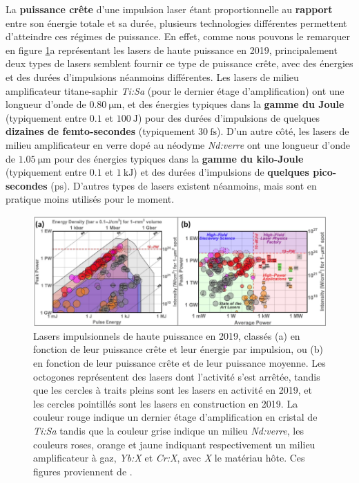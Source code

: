 \begin{refsection}
La \textbf{puissance crête} d'une impulsion laser étant proportionnelle au \textbf{rapport} entre son énergie totale et sa durée, plusieurs technologies différentes permettent d'atteindre ces régimes de puissance. En effet, comme nous pouvons le remarquer en figure \ref{fig:2-techno_laser}a représentant les lasers de haute puissance en 2019, principalement deux types de lasers semblent fournir ce type de puissance crête, avec des énergies et des durées d'impulsions néanmoins différentes. Les lasers de milieu amplificateur titane-saphir \textit{Ti:Sa} (pour le dernier étage d'amplification) ont une longueur d'onde de $0.80 ~ \si{\um}$, et des énergies typiques dans la \textbf{gamme du Joule} (typiquement entre $0.1$ et $100 ~ \si{\J}$) pour des durées d'impulsions de quelques \textbf{dizaines de femto-secondes} (typiquement $30 ~ \si{\fs}$). D'un autre côté, les lasers de milieu amplificateur en verre dopé au néodyme \textit{Nd:verre} ont une longueur d'onde de $1.05 ~ \si{\um}$ pour des énergies typiques dans la \textbf{gamme du kilo-Joule} (typiquement entre $0.1$ et $1~ \si{\kJ}$) et des durées d'impulsions de \textbf{quelques pico-secondes} ($\si{\ps}$). D'autres types de lasers existent néanmoins, mais sont en pratique moins utilisés pour le moment.

\begin{figure}[htbp]
    \centering
    \includegraphics[width=\linewidth]{2-laser/laser_power_Danson.png}
    \caption{Lasers impulsionnels de haute puissance en 2019, classés (a) en fonction de leur puissance crête et leur énergie par impulsion, ou (b) en fonction de leur puissance crête et de leur puissance moyenne. Les octogones représentent des lasers dont l'activité s'est arrêtée, tandis que les cercles à traits pleins sont les lasers en activité en 2019, et les cercles pointillés sont les lasers en construction en 2019. La couleur rouge indique un dernier étage d'amplification en cristal de \textit{Ti:Sa} tandis que la couleur grise indique un milieu \textit{Nd:verre}, les couleurs roses, orange et jaune indiquant respectivement un milieu amplificateur à gaz, \textit{Yb:X} et \textit{Cr:X}, avec \textit{X} le matériau hôte. Ces figures proviennent de \parencite{danson_2019}.}
    \label{fig:2-techno_laser}
\end{figure}


\end{refsection}
